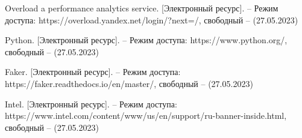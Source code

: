 \begin{thebibliography}{}
	Overload a performance analytics service. [Электронный ресурс]. – Режим доступа:
	https://overload.yandex.net/login/?next=/,
	свободный – (27.05.2023)
	
	Python. [Электронный ресурс]. – Режим доступа:
	https://www.python.org/,
	свободный – (27.05.2023)
	
	Faker. [Электронный ресурс]. – Режим доступа:
	https://faker.readthedocs.io/en/master/,
	свободный – (27.05.2023)
	
	Intel. [Электронный ресурс]. – Режим доступа:
	https://www.intel.com/content/www/us/en/support/ru-banner-inside.html,
	свободный – (27.05.2023)
	
\end{thebibliography}
\endgroup

\pagebreak
